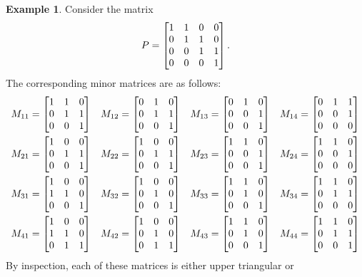 \documentclass[reqno]{amsart}
\theoremstyle{definition}
\newtheorem{example}[theorem]{Example}
\begin{document}
\begin{example}\label{eg-adjugate-jordan}
 Consider the matrix
 \[ P = \left[\begin{matrix} 1&1&0&0 \\ 0&1&1&0 \\ 0&0&1&1 \\ 0&0&0&1 \end{matrix}\right]. \]
 The corresponding minor matrices are as follows:
 \begin{align*}
  M_{11} &= \left[\begin{matrix} 1&1&0\\ 0&1&1 \\ 0&0&1 \end{matrix}\right] &
  M_{12} &= \left[\begin{matrix} 0&1&0\\ 0&1&1 \\ 0&0&1 \end{matrix}\right] &
  M_{13} &= \left[\begin{matrix} 0&1&0\\ 0&0&1 \\ 0&0&1 \end{matrix}\right] &
  M_{14} &= \left[\begin{matrix} 0&1&1\\ 0&0&1 \\ 0&0&0 \end{matrix}\right] \\
  M_{21} &= \left[\begin{matrix} 1&0&0\\ 0&1&1 \\ 0&0&1 \end{matrix}\right] &
  M_{22} &= \left[\begin{matrix} 1&0&0\\ 0&1&1 \\ 0&0&1 \end{matrix}\right] &
  M_{23} &= \left[\begin{matrix} 1&1&0\\ 0&0&1 \\ 0&0&1 \end{matrix}\right] &
  M_{24} &= \left[\begin{matrix} 1&1&0\\ 0&0&1 \\ 0&0&0 \end{matrix}\right] \\
  M_{31} &= \left[\begin{matrix} 1&0&0\\ 1&1&0 \\ 0&0&1 \end{matrix}\right] &
  M_{32} &= \left[\begin{matrix} 1&0&0\\ 0&1&0 \\ 0&0&1 \end{matrix}\right] &
  M_{33} &= \left[\begin{matrix} 1&1&0\\ 0&1&0 \\ 0&0&1 \end{matrix}\right] &
  M_{34} &= \left[\begin{matrix} 1&1&0\\ 0&1&1 \\ 0&0&0 \end{matrix}\right] \\
  M_{41} &= \left[\begin{matrix} 1&0&0\\ 1&1&0 \\ 0&1&1 \end{matrix}\right] &
  M_{42} &= \left[\begin{matrix} 1&0&0\\ 0&1&0 \\ 0&1&1 \end{matrix}\right] &
  M_{43} &= \left[\begin{matrix} 1&1&0\\ 0&1&0 \\ 0&0&1 \end{matrix}\right] &
  M_{44} &= \left[\begin{matrix} 1&1&0\\ 0&1&1 \\ 0&0&1 \end{matrix}\right]
 \end{align*}
 By inspection, each of these matrices is either upper triangular or

\end{example}
\end{document}
